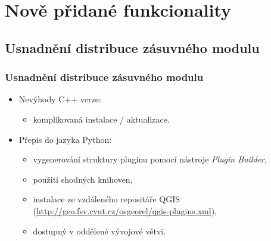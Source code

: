 \documentclass{beamer}
\begin{document}
\begin{frame}
\begin{columns}
\end{columns}

\end{frame}

\section{Nově přidané funkcionality}

\subsection{Usnadnění distribuce zásuvného modulu}

\begin{frame}
\frametitle{Usnadnění distribuce zásuvného modulu}

\begin{itemize}
 \item Nevýhody C++ verze:
 
 \begin{itemize}
  \item komplikovaná instalace / aktualizace.
 \end{itemize}
 
 \item Přepis do jazyka Python:
 
 \begin{itemize}
  \item vygenerování struktury pluginu pomocí nástroje \textit{Plugin Builder},
  \item použití shodných knihoven,
  \item instalace ze vzdáleného repositáře QGIS (\url{http://geo.fsv.cvut.cz/osgeorel/qgis-plugins.xml}),
  \item dostupný v oddělené vývojové větvi.
 \end{itemize}

\end{itemize}

\end{frame}

\end{document}
